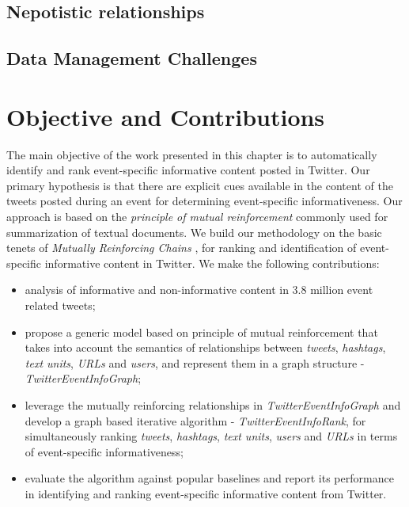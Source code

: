 \subsection{Nepotistic relationships}

\subsection{Data Management Challenges}



\section{Objective and Contributions} The main objective of the work presented in this chapter is to automatically identify and rank event-specific informative content posted in Twitter. Our primary hypothesis is that there are explicit cues available in the content of the tweets posted during an event for determining event-specific informativeness. Our approach is based on the \textit{principle of mutual reinforcement} commonly used for summarization of textual documents. We build our methodology on the basic tenets of \textit{Mutually Reinforcing Chains} \cite{wei2008query}, for ranking and identification of event-specific informative content in Twitter. We make the following contributions:



\begin{itemize}
\item analysis of informative and non-informative content in 3.8 million event related tweets;
\item propose a generic model based on principle of mutual reinforcement that takes into account the semantics of relationships between \textit{tweets}, \textit{hashtags}, \textit{text units}, \textit{URLs} and \textit{users}, and represent them in a graph structure - \textit{TwitterEventInfoGraph};
\item leverage the mutually reinforcing relationships in \textit{TwitterEventInfoGraph} and develop a graph based iterative algorithm - \textit{TwitterEventInfoRank}, for simultaneously ranking \textit{tweets}, \textit{hashtags}, \textit{text units}, \textit{users} and \textit{URLs} in terms of event-specific informativeness;
\item evaluate the algorithm against popular baselines and report its performance in identifying and ranking event-specific informative content from Twitter.
\end{itemize}



